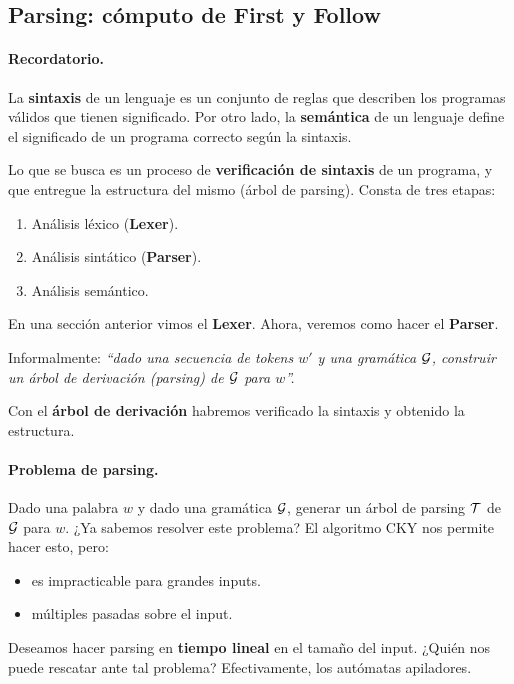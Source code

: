 \subsection{Parsing: cómputo de First y Follow}

\paragraph{Recordatorio.} La \textbf{sintaxis} de un lenguaje es un conjunto de reglas que describen los programas válidos que tienen significado. Por otro lado, la \textbf{semántica} de un lenguaje define el significado de un programa correcto según la sintaxis.

Lo que se busca es un proceso de \textbf{verificación de sintaxis} de un programa, y que entregue la estructura del mismo (árbol de parsing). Consta de tres etapas:
\begin{enumerate}
    \item Análisis léxico (\textbf{Lexer}).
    \item Análisis sintático (\textbf{Parser}).
    \item Análisis semántico.
\end{enumerate}
En una sección anterior vimos el \textbf{Lexer}. Ahora, veremos como hacer el \textbf{Parser}. \medbreak

Informalmente: \textit{``dado una secuencia de tokens $w'$ y una gramática $\mathcal{G}$, construir un árbol de derivación (parsing) de $\mathcal{G}$ para $w$''.} \medbreak

Con el \textbf{árbol de derivación} habremos verificado la sintaxis y obtenido la estructura.

\newpage


\paragraph{Problema de parsing.} Dado una palabra $w$ y dado una gramática $\mathcal{G}$, generar un árbol de parsing $\mathcal{T}$ de $\mathcal{G}$ para $w$. ¿Ya sabemos resolver este problema? El algoritmo CKY nos permite hacer esto, pero:
\begin{itemize}
    \item es impracticable para grandes inputs.
    \item múltiples pasadas sobre el input.
\end{itemize}
Deseamos hacer parsing en \textbf{tiempo lineal} en el tamaño del input. ¿Quién nos puede rescatar ante tal problema? Efectivamente, los autómatas apiladores. \medbreak

